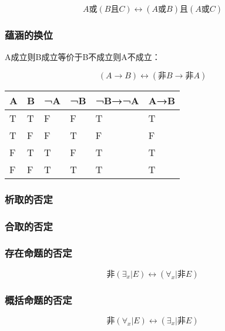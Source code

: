 \documentclass[12pt,oneside]{book}
\begin{document}
\begin{equation}
A \text{或} (B \text{且} C) \leftrightarrow (A \text{或} B) \text{且} (A \text{或} C)
\end{equation}

\subsubsection{蕴涵的换位}
A成立则B成立等价于B不成立则A不成立：

\begin{equation}
(A \rightarrow B) \leftrightarrow (\text{非}B \rightarrow \text{非}A)
\end{equation}

\begin{table}[H]
\begin{tabular}{@{}llllll@{}}
\toprule
{A} & {B} & {¬A} & {¬B} & {¬B→¬A} & {A→B} \\ \midrule

{T}          & {T} & {F}  & {F}  & {T}     & {T}   \\
{T}          & {F} & {F}  & {T}  & {F}     & {F}   \\
{F}          & {T} & {T}  & {F}  & {T}     & {T}   \\
{F}          & {F} & {T}  & {T}  & {T}     & {T}   \\ \bottomrule
\end{tabular}
\end{table}

\subsubsection{析取的否定}

\subsubsection{合取的否定}

\subsubsection{存在命题的否定}
\begin{equation}
\text{非}(\exists_x | E) \leftrightarrow (\forall_x | \text{非}E)
\end{equation}

\subsubsection{概括命题的否定}
\begin{equation}
\text{非}(\forall_x | E) \leftrightarrow (\exists_x | \text{非}E)
\end{equation}
\end{document}
